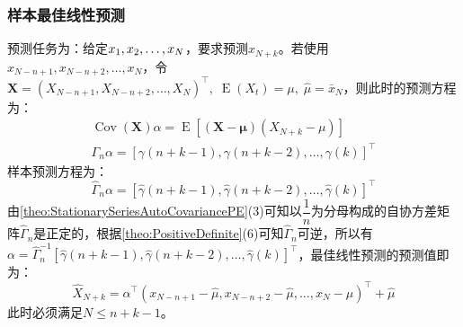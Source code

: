 \subsubsection{样本最佳线性预测}
\begin{derivation}
	预测任务为：给定$x_1, x_2, \dots, x_{N}$，要求预测$x_{N+k}$。若使用$x_{N-n+1},x_{N-n+2},\dots,x_{N}$，令$\mathbf{X}=(X_{N-n+1},X_{N-n+2},\dots,X_N)^{\top},\;\operatorname{E}(X_t)=\mu,\;\hat{\mu}=\bar{x}_N$，则此时的预测方程为：
	\begin{gather*}
		\operatorname{Cov}(\mathbf{X})\alpha=\operatorname{E}[(\mathbf{X}-\boldsymbol{\mu})(X_{N+k}-\mu)] \\
		\Gamma_n\alpha=[\gamma(n+k-1),\gamma(n+k-2),\dots,\gamma(k)]^{\top}
	\end{gather*}
	样本预测方程为：
	\begin{equation*}
		\hat{\Gamma}_n\alpha=[\hat{\gamma}(n+k-1),\hat{\gamma}(n+k-2),\dots,\hat{\gamma}(k)]^{\top}
	\end{equation*}
	由\cref{theo:StationarySeriesAutoCovariancePE}(3)可知以$\dfrac{1}{n}$为分母构成的自协方差矩阵$\hat{\Gamma}_n$是正定的，根据\cref{theo:PositiveDefinite}(6)可知$\hat{\Gamma}_n$可逆，所以有$\alpha=\hat{\Gamma}_n^{-1}[\hat{\gamma}(n+k-1),\hat{\gamma}(n+k-2),\dots,\hat{\gamma}(k)]^{\top}$，最佳线性预测的预测值即为：
	\begin{equation*}
		\hat{X}_{N+k}=\alpha^{\top}(x_{N-n+1}-\hat{\mu},x_{N-n+2}-\hat{\mu},\dots,x_{N}-\hat{\mu})^{\top}+\hat{\mu}
	\end{equation*}
	此时必须满足$N\leqslant n+k-1$。
\end{derivation}

